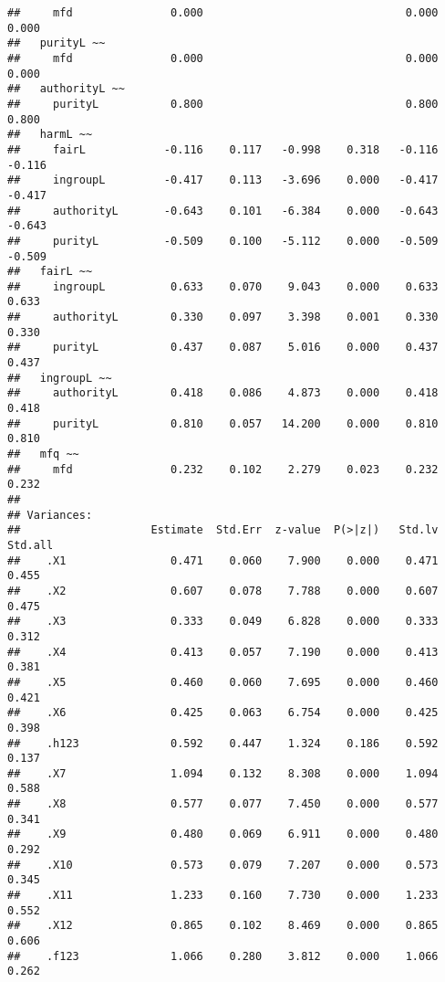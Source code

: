 \documentclass[english,man]{apa6}
\newcounter{author}
\theoremstyle{definition}
\theoremstyle{definition}
\theoremstyle{definition}
\theoremstyle{remark}
\begin{document}
\begin{verbatim}
##     mfd               0.000                               0.000    0.000
##   purityL ~~                                                            
##     mfd               0.000                               0.000    0.000
##   authorityL ~~                                                         
##     purityL           0.800                               0.800    0.800
##   harmL ~~                                                              
##     fairL            -0.116    0.117   -0.998    0.318   -0.116   -0.116
##     ingroupL         -0.417    0.113   -3.696    0.000   -0.417   -0.417
##     authorityL       -0.643    0.101   -6.384    0.000   -0.643   -0.643
##     purityL          -0.509    0.100   -5.112    0.000   -0.509   -0.509
##   fairL ~~                                                              
##     ingroupL          0.633    0.070    9.043    0.000    0.633    0.633
##     authorityL        0.330    0.097    3.398    0.001    0.330    0.330
##     purityL           0.437    0.087    5.016    0.000    0.437    0.437
##   ingroupL ~~                                                           
##     authorityL        0.418    0.086    4.873    0.000    0.418    0.418
##     purityL           0.810    0.057   14.200    0.000    0.810    0.810
##   mfq ~~                                                                
##     mfd               0.232    0.102    2.279    0.023    0.232    0.232
## 
## Variances:
##                    Estimate  Std.Err  z-value  P(>|z|)   Std.lv  Std.all
##    .X1                0.471    0.060    7.900    0.000    0.471    0.455
##    .X2                0.607    0.078    7.788    0.000    0.607    0.475
##    .X3                0.333    0.049    6.828    0.000    0.333    0.312
##    .X4                0.413    0.057    7.190    0.000    0.413    0.381
##    .X5                0.460    0.060    7.695    0.000    0.460    0.421
##    .X6                0.425    0.063    6.754    0.000    0.425    0.398
##    .h123              0.592    0.447    1.324    0.186    0.592    0.137
##    .X7                1.094    0.132    8.308    0.000    1.094    0.588
##    .X8                0.577    0.077    7.450    0.000    0.577    0.341
##    .X9                0.480    0.069    6.911    0.000    0.480    0.292
##    .X10               0.573    0.079    7.207    0.000    0.573    0.345
##    .X11               1.233    0.160    7.730    0.000    1.233    0.552
##    .X12               0.865    0.102    8.469    0.000    0.865    0.606
##    .f123              1.066    0.280    3.812    0.000    1.066    0.262

\end{verbatim}
\end{document}
